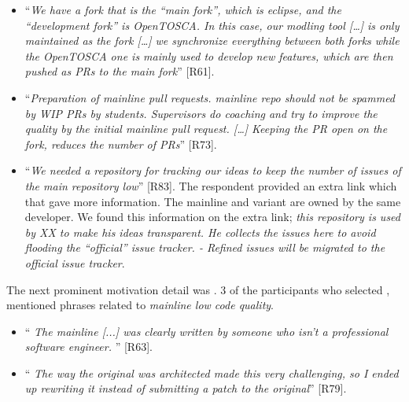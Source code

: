 \begin{itemize}[leftmargin=*]
\item ``\emph{We have a fork that is the ``main fork'', which is eclipse, and the ``development fork'' is OpenTOSCA. In this case, our modling tool [\ldots] is only maintained as the fork [\ldots] we synchronize everything between both forks while the OpenTOSCA one is mainly used to develop new features, which are then pushed as PRs to the main fork}'' [R61].

\item ``\emph{Preparation of mainline pull requests. mainline repo should not be spammed by WIP PRs by students. Supervisors do coaching and try to improve the quality by the initial mainline pull request. [\dots] Keeping the PR open on the fork, reduces the number of PRs}'' [R73].

\item ``\emph{We needed a repository for tracking our ideas to keep the number of issues of the main repository low}'' [R83]. The respondent provided an extra link which that gave more information. The mainline and variant are owned by the same developer. We found this information on the extra link; \emph{this repository is used by XX to make his ideas transparent. He collects the issues here to avoid flooding the ``official'' issue tracker. - Refined issues will be migrated to the official issue tracker}.
\end{itemize}

\nd The next prominent  motivation detail was .
3 of the participants who selected , mentioned phrases related to \emph{mainline low code quality}.

\begin{itemize}[leftmargin=*]
\item ``\emph{%
The mainline [...] %
was clearly written by someone who isn't a professional software engineer.%
}'' [R63].

\item ``\emph{%
The way the original was architected made this very challenging, so I ended up rewriting it instead of submitting a patch to the original}'' [R79].
\end{itemize}


